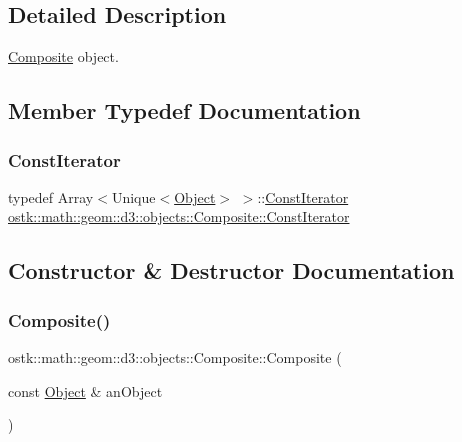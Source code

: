 \subsection{Detailed Description}
\hyperlink{classostk_1_1math_1_1geom_1_1d3_1_1objects_1_1_composite}{Composite} object. 

\subsection{Member Typedef Documentation}
\mbox{\label{classostk_1_1math_1_1geom_1_1d3_1_1objects_1_1_composite_ab1f78408fec2e435dc1172cf2675b0a9}} 
\subsubsection{\texorpdfstring{Const\+Iterator}{ConstIterator}}
{\footnotesize\ttfamily typedef Array$<$Unique$<$\hyperlink{classostk_1_1math_1_1geom_1_1d3_1_1_object}{Object}$>$ $>$\+::\hyperlink{classostk_1_1math_1_1geom_1_1d3_1_1objects_1_1_composite_ab1f78408fec2e435dc1172cf2675b0a9}{Const\+Iterator} \hyperlink{classostk_1_1math_1_1geom_1_1d3_1_1objects_1_1_composite_ab1f78408fec2e435dc1172cf2675b0a9}{ostk\+::math\+::geom\+::d3\+::objects\+::\+Composite\+::\+Const\+Iterator}}



\subsection{Constructor \& Destructor Documentation}
\mbox{\label{classostk_1_1math_1_1geom_1_1d3_1_1objects_1_1_composite_aaecda2f184484d63a52de87706a37d4c}} 
\subsubsection{\texorpdfstring{Composite()}{Composite()}\hspace{0.1cm}{\footnotesize\ttfamily [1/4]}}
{\footnotesize\ttfamily ostk\+::math\+::geom\+::d3\+::objects\+::\+Composite\+::\+Composite (\begin{DoxyParamCaption}\item[{const \hyperlink{classostk_1_1math_1_1geom_1_1d3_1_1_object}{Object} \&}]{an\+Object }\end{DoxyParamCaption})\hspace{0.3cm}{\ttfamily [explicit]}}




